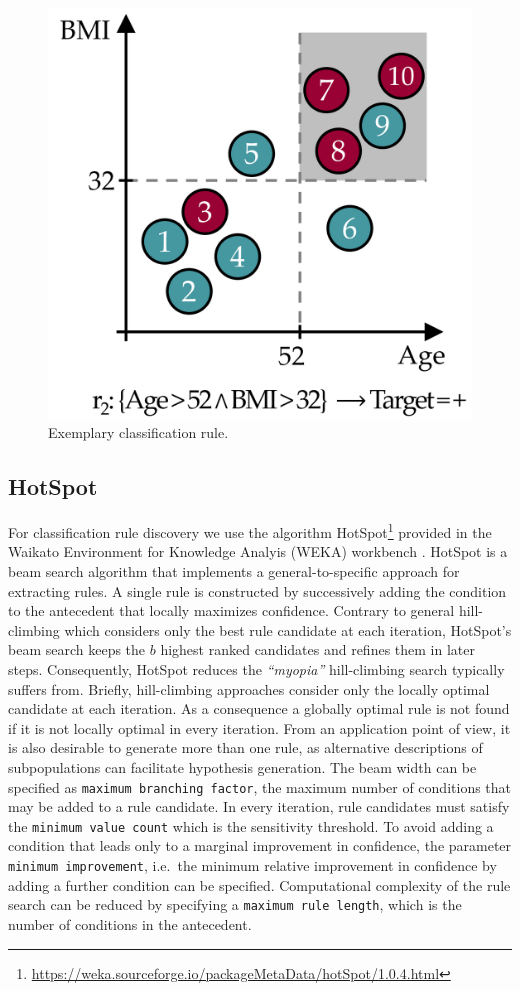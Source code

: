 \documentclass[
  oneside]{book}
\begin{document}
\begin{figure}

{\centering \includegraphics[width=0.5\linewidth]{figures/03-rule-intro} 

}

\caption{Exemplary classification rule.}\label{fig:03-rule-intro}
\end{figure}

\hypertarget{hotspot}{%
\subsection{HotSpot}\label{hotspot}}

For classification rule discovery we use the algorithm HotSpot\footnote{\url{https://weka.sourceforge.io/packageMetaData/hotSpot/1.0.4.html}} provided in the Waikato Environment for Knowledge Analyis (WEKA) workbench \autocite{FrankEtAl:Weka2016}.
HotSpot is a beam search algorithm that implements a general-to-specific approach for extracting rules.
A single rule is constructed by successively adding the condition to the
antecedent that locally maximizes confidence.
Contrary to general hill-climbing which considers only the best rule candidate at each iteration, HotSpot's beam search keeps the \(b\) highest ranked candidates and refines them in later steps.
Consequently, HotSpot reduces the \emph{``myopia''} \autocite{Fuernkranz:12} hill-climbing search typically suffers from.
Briefly, hill-climbing approaches consider only the locally optimal candidate at each iteration.
As a consequence a globally optimal rule is not found if it is not locally optimal in every iteration.
From an application point of view, it is also desirable to generate more than one rule, as alternative descriptions of subpopulations can facilitate hypothesis generation.
The beam width can be specified as \texttt{maximum\ branching\ factor}, the maximum number of conditions that may be added to a rule candidate.
In every iteration, rule candidates must satisfy the \texttt{minimum\ value\ count} which is the sensitivity threshold.
To avoid adding a condition that leads only to a marginal improvement in confidence, the parameter \texttt{minimum\ improvement}, i.e.~the minimum relative improvement in confidence by adding a further condition can be specified.
Computational complexity of the rule search can be reduced by specifying a \texttt{maximum\ rule\ length}, which is the number of conditions in the antecedent.
\end{document}

